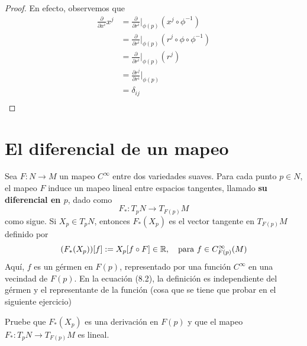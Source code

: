\documentclass[12pt]{report}
\theoremstyle{largebreak}
\newcommand{\cf}[3]{\ensuremath{#1:#2\rightarrow#3}}
\begin{document}
    \begin{proof}
        En efecto, observemos que
        \begin{equation*}
            \begin{split}
                \frac{\partial}{\partial x^i}x^j&=\frac{\partial}{\partial r^i}\Big|_{\phi(p)}(x^j\circ\phi^{-1})\\
                &=\frac{\partial}{\partial r^i}\Big|_{\phi(p)}(r^j\circ\phi\circ\phi^{-1})\\
                &=\frac{\partial}{\partial r^i}\Big|_{\phi(p)}(r^j)\\
                &=\frac{\partial r^j}{\partial r^i}\Big|_{\phi(p)}\\
                &=\delta_{ij}\\
            \end{split}
        \end{equation*}
    \end{proof}

    \section{El diferencial de un mapeo}

    \begin{mydef}
        Sea $\cf{F}{N}{M}$ un mapeo $C^\infty$ entre dos variedades suaves. Para cada punto $p\in N$, el mapeo $F$ induce un mapeo lineal entre espacios tangentes, llamado \textbf{su diferencial en $p$}, dado como
        \begin{equation*}
            F_*:T_pN\rightarrow T_{F(p)}M
        \end{equation*}
        como sigue. Si $X_p\in T_pN$, entonces $F_*(X_p)$ es el vector tangente en $T_{F(p)}M$ definido por
        \begin{equation}
            (F_*(X_p))[f]:=X_p[f\circ F]\in\mathbb{R},\quad\textup{para }f\in C_{F(p)}^\infty(M)
        \end{equation}
        Aquí, $f$ es un gérmen en $F(p)$, representado por una función $C^\infty$ en una vecindad de $F(p)$. En la ecuación (8.2), la definición es independiente del gérmen y el representante de la función (cosa que se tiene que probar en el siguiente ejercicio)
    \end{mydef}

    \begin{excer}
        Pruebe que $F_*(X_p)$ es una derivación en $F(p)$ y que el mapeo $F_*:T_pN\rightarrow T_{F(p)}M$ es lineal.
    \end{excer}
\end{document}
